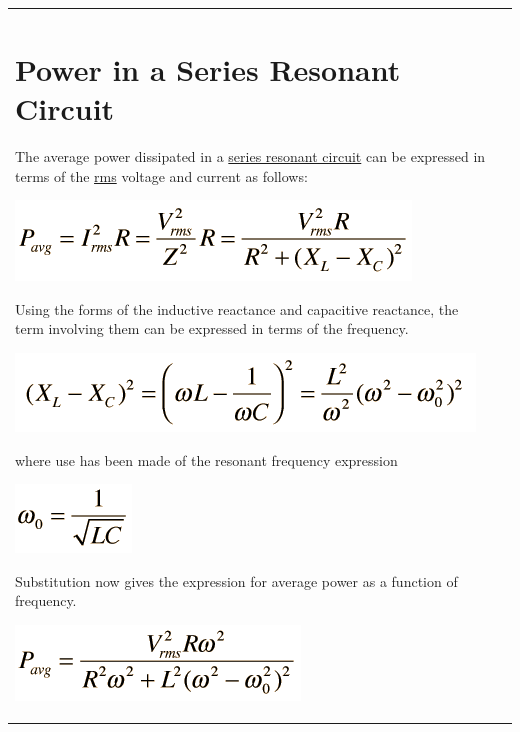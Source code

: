 \begin{longtable}[]{@{}ll@{}}
\toprule
\begin{minipage}[t]{0.48\columnwidth}\raggedright\strut
\section{Power in a Series Resonant
Circuit}\label{power-in-a-series-resonant-circuit}

The average power dissipated in a
\href{http://hyperphysics.phy-astr.gsu.edu/hbase/electric/serres.html\#c2}{series
resonant circuit} can be expressed in terms of the
\href{http://hyperphysics.phy-astr.gsu.edu/hbase/electric/acres.html\#c2}{rms}
voltage and current as follows:

\includegraphics{./resonant-rlc-circuits_files/pser.png}

Using the forms of the inductive reactance and capacitive reactance, the
term involving them can be expressed in terms of the frequency.

\includegraphics{./resonant-rlc-circuits_files/pser2.png}

where use has been made of the resonant frequency expression

\includegraphics{./resonant-rlc-circuits_files/pser3.png}

Substitution now gives the expression for average power as a function of
frequency.

\includegraphics{./resonant-rlc-circuits_files/pser4.png}


\end{minipage}
\end{longtable}
